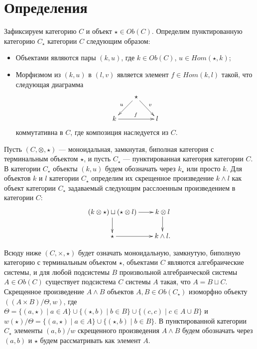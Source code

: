 \documentclass[a4paper,12pt]{article}
\begin{document}
\section*{Определения}

Зафиксируем категорию $C$ и объект $\star \in Ob(C)$. Определим пунктированную категорию $C_\star$ категории $C$ следующим образом:
\begin{itemize}
    \item Объектами являются пары $(k,u)$, где $k \in Ob(C)$, $u \in Hom(\star,k)$;
    \item Морфизмом из $(k,u)$ в $(l,v)$ является элемент $f \in Hom(k,l)$ такой, что следующая диаграмма
    $$\xymatrix@R=2em@C=2em{
        &\star \ar[ld]_u \ar[rd]^v&\\
        k \ar[rr]^f && l
    }$$
    коммутативна в $C$, где композиция наследуется из $C$.
\end{itemize}

Пусть $(C,\otimes,\star)$ --- моноидальная, замкнутая, биполная категория с терминальным объектом $\star$, и пусть $C_\star$ --- пунктированная категория категории $C$. В категории $C_\star$ объекты $(k,u)$ будем обозначать через $k_\star$ или просто $k$. Для объектов $k$ и $l$ категории $C_\star$ определим их скрещенное произведение $k \wedge l$ как объект категории $C_\star$ задаваемый следующим расслоенным произведением в категории $C$:
$$\xymatrix@R=2em@C=2em{
    (k \otimes \star) \sqcup (\star \otimes l) \ar[r] \ar[d] & k \otimes l \ar[d]\\
    \star \ar[r] & k \wedge l.
}$$

Всюду ниже $(C, \times, \star)$ будет означать моноидальную, замкнутую, биполную категорию с терминальным объектом $\star$, объектами $C$ являются алгебраические системы, и для любой подсистемы $B$ произвольной алгебраической системы $A \in Ob(C)$ существует подсистема $C$ системы $A$ такая, что $A = B \sqcup C$. Скрещенное произведение $A \wedge B$ объектов $A, B \in Ob(C_\star)$ изоморфно объекту $((A \times B)/\Theta,w)$, где $\Theta = \{(a,\star) \mid a \in A\} \cup \{(\star,b) \mid b \in B\} \cup \{(c,c) \mid c \in A \cup B\}$ и $w(\star)/\Theta = \{(a,\star) \mid a \in A\} \cup \{(\star, b) \mid b \in B\}$. В пунктированной категории $C_\star$ элементы $(a,b)/w$ скрещенного произведения $A \wedge B$ будем обозначать через $(a,b)$ и $\star$ будем рассматривать как элемент $A$.
\end{document}
